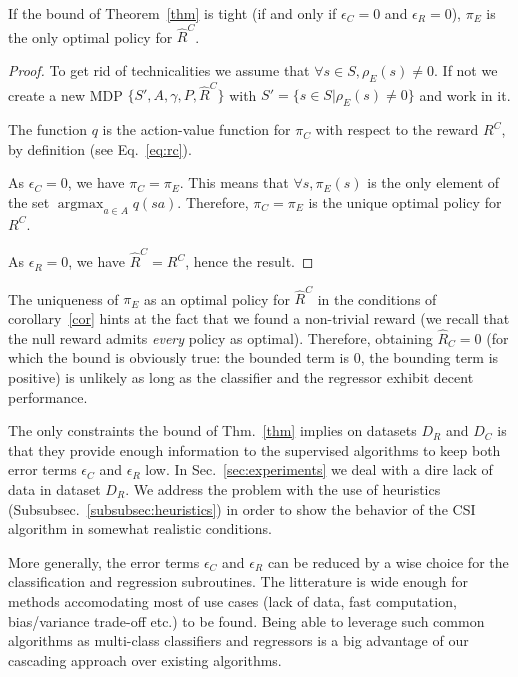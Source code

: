 \documentclass[smallextended]{svjour3}
\newcommand{\argmax}{\operatorname*{argmax}} %
\begin{document}
\begin{corollary}
  \label{cor}
  If the bound of Theorem~\ref{thm} is tight (if and only if $\epsilon_C = 0$ and $\epsilon_R = 0$), $\pi_E$ is the only optimal policy for $\hat R^C$.
\end{corollary}
\begin{proof}
  To get rid of technicalities we assume that $\forall s \in S, \rho_E(s) \neq 0$. If not we create a new MDP $\{S',A,\gamma,P,\hat R^C\}$ with $S' = \{s \in S | \rho_E(s) \neq 0\}$ and work in it.

  The function $q$ is the action-value function for $\pi_C$ with respect to the reward $R^C$, by definition (see Eq.~\eqref{eq:rc}).

  As $\epsilon_C = 0$, we have $\pi_C = \pi_E$. This means that $\forall s, \pi_E(s)$ is the only element of the set $\argmax_{a\in A}q(sa)$. Therefore, $\pi_C = \pi_E$ is the unique optimal policy for $R^C$.

  As $\epsilon_R = 0$, we have $\hat R^C = R^C$, hence the result.
\end{proof}
The uniqueness of $\pi_E$ as an optimal policy for $\hat R^C$ in the conditions of corollary~\ref{cor} hints at the fact that we found a non-trivial reward (we recall that the null reward admits \emph{every} policy as optimal). Therefore, obtaining  $\hat{R}_C = 0$ (for which the bound is obviously true: the bounded term is $0$, the bounding term is positive) is unlikely as long as the classifier and the regressor exhibit decent performance.

The only constraints the bound of Thm.~\ref{thm} implies on datasets $D_R$ and $D_C$ is that they provide enough information to the supervised algorithms to keep both error terms $\epsilon_C$ and $\epsilon_R$ low. In Sec.~\ref{sec:experiments} we deal with a dire lack of data in dataset $D_R$. We address the problem with the use of heuristics (Subsubsec.~\ref{subsubsec:heuristics}) in order to show the behavior of the CSI algorithm in somewhat realistic conditions.

More generally, the error terms  $\epsilon_C$ and $\epsilon_R$ can be reduced by a wise choice for the classification and regression subroutines. The litterature is wide enough for methods accomodating most of use cases (lack of data, fast computation, bias/variance trade-off etc.) to be found. Being able to leverage such common algorithms as multi-class classifiers and regressors is a big advantage of our cascading approach over existing algorithms.
\end{document}
